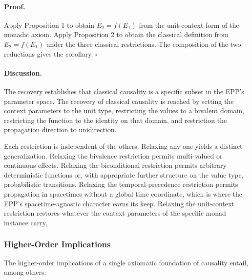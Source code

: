 \paragraph{Proof.}
Apply Proposition 1 to obtain $E_2 = f(E_1)$ from the unit-context form of the monadic axiom. Apply Proposition 2 to obtain the classical definition from $E_2 = f(E_1)$ under the three classical restrictions. The composition of the two reductions gives the corollary. $\square$

\paragraph{Discussion.}
The recovery establishes that classical causality is a specific subset in the EPP's parameter space. The recovery of classical causality is reached by setting the context parameters to the unit type, restricting the values to a bivalent domain, restricting the function to the identity on that domain, and restriction the propagation direction to unidirection. 

Each restriction is independent of the others. Relaxing any one yields a distinct generalization. Relaxing the bivalence restriction permits multi-valued or continuous effects. Relaxing the biconditional restriction permits arbitrary deterministic functions or, with appropriate further structure on the value type, probabilistic transitions. Relaxing the temporal-precedence restriction permits propagation in spacetimes without a global time coordinate, which is where the EPP's spacetime-agnostic character earns its keep. Relaxing the unit-context restriction restores whatever the context parameters of the specific monad instance carry,

\newpage
 


\subsubsection{Higher-Order Implications}
\label{sub:epp_higher_order_implications}


The higher-order implications of a single axiomatic foundation of causality entail, among others:

